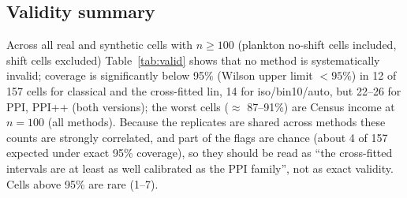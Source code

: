 \subsection{Validity summary}
Across all real and synthetic cells with $n\ge100$ (plankton no-shift cells included, shift cells excluded) Table~\ref{tab:valid} shows that no method is systematically invalid; coverage is significantly below 95\% (Wilson upper limit $<95\%$) in 12 of 157 cells for classical and the cross-fitted lin, 14 for iso/bin10/auto, but 22--26 for PPI, PPI++ (both versions); the worst cells ($\approx$ 87--91\%) are Census income at $n=100$ (all methods). Because the replicates are shared across methods these counts are strongly correlated, and part of the flags are chance (about 4 of 157 expected under exact 95\% coverage), so they should be read as ``the cross-fitted intervals are at least as well calibrated as the PPI family'', not as exact validity. Cells above 95\% are rare (1--7).

\begin{table}[t]\centering\small
\caption{Coverage over all cells with $n\ge100$ (real, distorted, synthetic and plankton no-shift; shift cells excluded).}\label{tab:valid}
\resizebox{\linewidth}{!}{}
\end{table}
